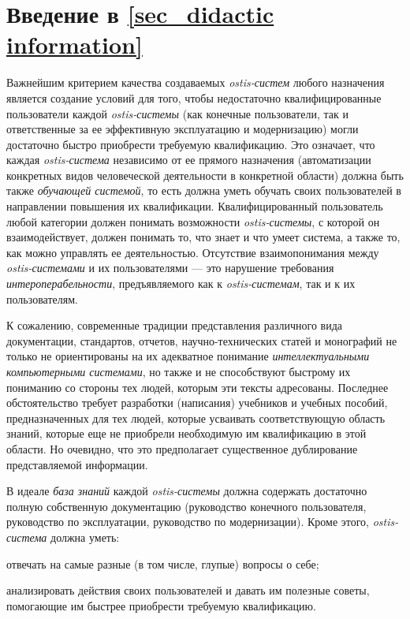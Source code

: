 \section*{Введение в \ref{sec_didactic information}}
Важнейшим критерием качества создаваемых \textit{ostis-систем} любого назначения является создание условий для того, чтобы недостаточно квалифицированные пользователи каждой \textit{ostis-системы} (как конечные пользователи, так и ответственные за ее эффективную эксплуатацию и модернизацию) могли достаточно быстро   приобрести требуемую квалификацию. Это означает, что каждая \textit{ostis-система} независимо от ее прямого назначения (автоматизации конкретных видов человеческой деятельности в конкретной области) должна быть также \textit{обучающей системой}, то есть должна уметь обучать своих пользователей в направлении повышения их квалификации. Квалифицированный пользователь любой категории должен понимать возможности \textit{ostis-системы}, с которой он взаимодействует, должен понимать то, что знает и что умеет система, а также то, как можно управлять ее деятельностью. Отсутствие взаимопонимания между \textit{ostis-системами} и их пользователями --- это нарушение требования \textit{интероперабельности}, предъявляемого как к \textit{ostis-системам}, так и к их пользователям.

К сожалению, современные традиции представления различного вида документации, стандартов, отчетов, научно-технических статей и монографий не только не ориентированы на их адекватное понимание \textit{интеллектуальными компьютерными системами}, но также и не способствуют быстрому их пониманию со стороны тех людей, которым эти тексты адресованы. Последнее обстоятельство требует разработки (написания) учебников и учебных пособий,  предназначенных для тех людей, которые  усваивать соответствующую область знаний, которые еще не приобрели необходимую им квалификацию в этой области. Но очевидно, что это предполагает существенное дублирование представляемой информации.

В идеале \textit{база знаний} каждой \textit{ostis-системы} должна содержать достаточно полную собственную документацию (руководство конечного пользователя, руководство по эксплуатации, руководство по модернизации). Кроме этого, \textit{ostis-система} должна уметь:
\begin{textitemize}
	\item отвечать на самые разные (в том числе, глупые) вопросы о себе;
	\item анализировать действия своих пользователей и давать им полезные советы, помогающие им быстрее приобрести требуемую квалификацию.
\end{textitemize}

